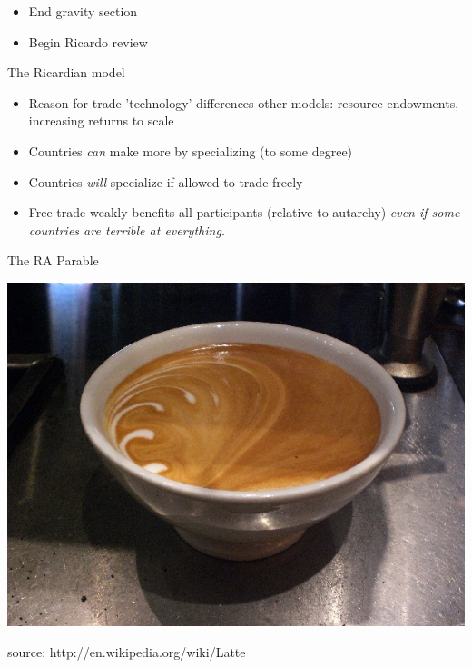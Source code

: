 \documentclass[ignorenonframetext,]{beamer}
\begin{document}
\begin{frame}

    \begin{itemize}
        \item End gravity section
        \item Begin Ricardo review
    \end{itemize}

\end{frame}

\begin{frame}{The Ricardian model}

    \begin{itemize}
        \item Reason for trade 'technology' differences {\footnotesize other models: resource endowments, increasing returns to scale}
        \item Countries \emph{can} make more by specializing (to some degree)
        \item Countries \emph{will} specialize if allowed to trade freely
        \item Free trade weakly benefits all participants (relative to autarchy) \emph{even if some countries are terrible at everything.}
    \end{itemize}

\end{frame}

\begin{frame}{The RA Parable}

    \begin{center}
        \includegraphics[scale=0.4]{latte.jpg}
    \end{center}

    {\tiny source: http://en.wikipedia.org/wiki/Latte}

\end{frame}
\end{document}
